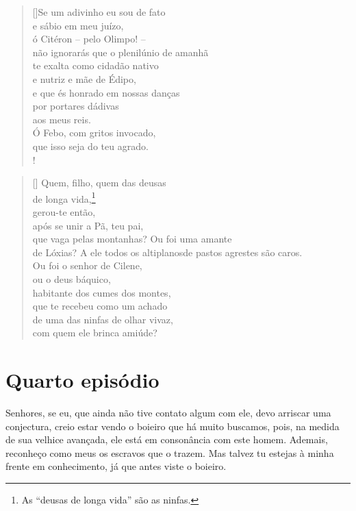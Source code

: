 \settowidth{\versewidth}{não ignorarás que o plenilúnio de amanhãxx}
\begin{verse}[\versewidth]Se um adivinho eu sou de fato\\
e sábio em meu juízo,\\
ó Citéron -- pelo Olimpo! --\\
não ignorarás que o plenilúnio de amanhã\\
te exalta como cidadão nativo\\
e nutriz e mãe de Édipo,\\
e que és honrado em nossas danças\\
por portares dádivas\\
aos meus reis.\\
Ó Febo, com gritos invocado,\\
que isso seja do teu agrado.\\!
\end{verse} 
\settowidth{\versewidth}{que vaga pelas montanhas? Ou foi uma amante}
\begin{verse}[\versewidth] 
Quem, filho, quem das deusas\\ 
de longa vida,\footnote{As ``deusas de longa vida'' são as ninfas.}\\
gerou-te então,\\
após se unir a Pã, teu pai,\\ 
que vaga pelas montanhas? Ou foi uma amante\\
de Lóxias? A ele todos os altiplanos\qb de pastos agrestes são caros.\\
Ou foi o senhor de Cilene,\\
ou o deus báquico,\\
habitante dos cumes dos montes,\\
que te recebeu como um achado\\
de uma das ninfas de olhar vivaz,\\
com quem ele brinca amiúde?
\end{verse}


\section{Quarto episódio}

   Senhores, se eu, que ainda não tive contato algum com ele, devo
arriscar uma conjectura, creio estar vendo o boieiro que há muito
buscamos, pois, na medida de sua velhice avançada, ele está em
consonância com este homem. Ademais, reconheço como meus os escravos que
o trazem. Mas talvez tu estejas à minha frente em conhecimento, já que
antes viste o boieiro.

